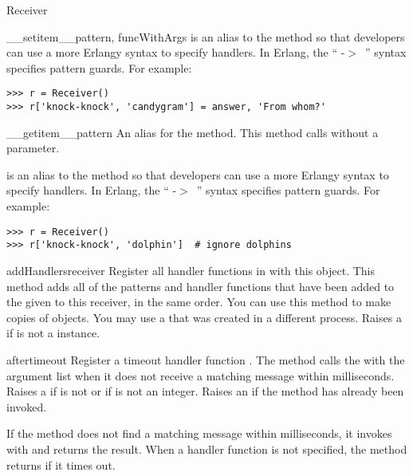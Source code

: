 \documentclass{howto}
\newcommand{\greaterthan}[0]{\begin{math}>\end{math}}
\newcommand{\greaterthan}[0]{>}
\begin{document}
\begin{classdesc}{Receiver}{}
\begin{methoddesc}{__setitem__}{pattern, funcWithArgs}
 is an alias to the  method so that
developers can use a more Erlangy syntax to specify handlers. In Erlang, the
`` -\greaterthan\ '' syntax specifies pattern guards. For
example:
\begin{verbatim}
>>> r = Receiver()
>>> r['knock-knock', 'candygram'] = answer, 'From whom?'
\end{verbatim}
\end{methoddesc}

\begin{methoddesc}{__getitem__}{pattern}
\opindex{[]}
An alias for the  method. This method calls
 without a  parameter.

 is an alias to the  method so that
developers can use a more Erlangy syntax to specify handlers. In Erlang, the
`` -\greaterthan\ '' syntax specifies pattern guards. For
example:
\begin{verbatim}
>>> r = Receiver()
>>> r['knock-knock', 'dolphin']  # ignore dolphins
\end{verbatim}
\end{methoddesc}

\begin{methoddesc}{addHandlers}{receiver}
Register all handler functions in  with this 
object. This method adds all of the patterns and handler functions that have
been added to the given  to this receiver, in the same order. You
can use this method to make copies of  objects. You may use a
 that was created in a different process. Raises a 
 if  is not a  instance.
\end{methoddesc}

\begin{methoddesc}{after}{timeout}
Register a timeout handler function . The  method
calls the  with the  argument list when it does not receive
a matching message within  milliseconds. Raises a 
 if  is not  or if
 is not an integer. Raises an  if the
 method has already been invoked.

If the  method does not find a matching message within
 milliseconds, it invokes  with  and returns
the result. When a handler function  is not specified, the
 method returns  if it times out.


\end{methoddesc}
\end{classdesc}
\end{document}
